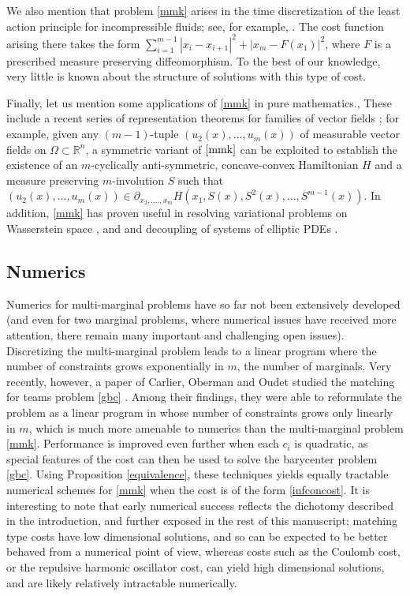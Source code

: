 \documentclass[letter,10pt]{article}
\theoremstyle{dotless}
\begin{document}
We  also mention that problem \eqref{mmk} arises in the time discretization of the least action principle for incompressible fluids; see, for example, \cite{bren2}.  The cost function arising there takes the form $\sum_{i=1}^{m-1}|x_i-x_{i+1}|^2 +|x_{m} -F(x_1)|^2$, where $F$ is a prescribed measure preserving diffeomorphism. To the best of our knowledge, very little is known about the structure of solutions with this type of cost.

Finally, let us mention some applications of \eqref{mmk} in pure mathematics.,  These include a recent series of representation theorems for families of vector fields \cite{GG}\cite{GhM}\cite{GhMa}; for example, given any $(m-1)$-tuple $(u_2(x),...,u_m(x))$ of measurable vector fields on $\Omega \subset \mathbb{R}^n$, a symmetric variant of $\eqref{mmk}$ can be exploited to establish the existence of an $m$-cyclically anti-symmetric, concave-convex Hamiltonian $H$ and a measure preserving $m$-involution $S$ such that $(u_2(x),...,u_m(x)) \in \partial_{x_2,....,x_m}H(x_1,S(x),S^2(x),...,S^{m-1}(x))$.  In addition, \eqref{mmk} has proven useful in resolving variational problems on Wasserstein space \cite{Dahl}, and and decoupling of systems of elliptic PDEs \cite{GhP1}.

\subsection{Numerics}
Numerics for multi-marginal problems have so far not been extensively developed (and even for two marginal problems, where numerical issues have received more attention, there remain many important and challenging open issues).  Discretizing the multi-marginal problem leads to a linear program where the number of constraints grows exponentially in $m$, the number of marginals.  Very recently, however, a paper of Carlier, Oberman and Oudet studied the matching for teams  problem \eqref{gbc} \cite{coo}.  Among their findings, they were able to reformulate the problem as a linear program in whose number of constraints grows only linearly in $m$, which is much more amenable to numerics than the multi-marginal problem \eqref{mmk}.  Performance is improved even further when each $c_i$ is quadratic, as special features of the cost can then be used to solve the barycenter problem \eqref{gbc}. Using Proposition \ref{equivalence}, these techniques yields equally tractable numerical schemes for \eqref{mmk} when the cost is of the form \eqref{infconcost}.  It is interesting to note that early numerical success reflects the dichotomy described in the introduction, and further exposed in the rest of this manuscript; matching type costs have low dimensional solutions, and so can be expected to be better behaved from a numerical point of view, whereas costs such as the Coulomb cost, or the repulsive harmonic oscillator cost, can yield high dimensional solutions, and are likely relatively intractable numerically.
\end{document}
